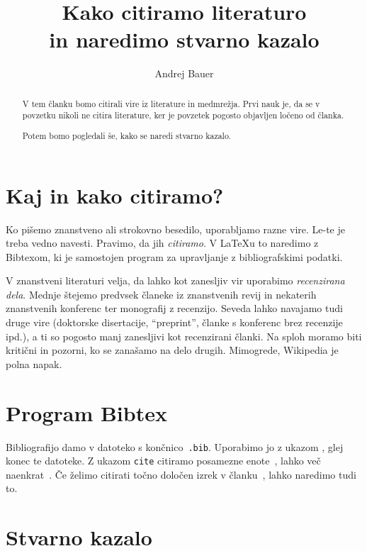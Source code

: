 \documentclass{article}
\begin{document}
\title{Kako citiramo literaturo\\ in naredimo stvarno kazalo}
\author{Andrej Bauer}
\maketitle

\begin{abstract}
  V tem članku bomo citirali vire iz literature in medmrežja.
  Prvi nauk je, da se v povzetku nikoli ne citira literature,
  ker je povzetek pogosto objavljen ločeno od članka.

  Potem bomo pogledali še, kako se naredi stvarno kazalo.
\end{abstract}


\section{Kaj in kako citiramo?}

Ko pišemo znanstveno ali strokovno besedilo, uporabljamo razne vire. Le-te je treba vedno
navesti. Pravimo, da jih \emph{citiramo}. V {\LaTeX}u to naredimo z Bibtexom, ki je
samostojen program za upravljanje z bibliografskimi podatki.

V znanstveni literaturi velja, da lahko kot zanesljiv vir uporabimo \emph{recenzirana
  dela}. Mednje štejemo predvsek članeke iz znanstvenih revij in nekaterih znanstvenih
konferenc ter monografij z recenzijo. Seveda lahko navajamo tudi druge vire (doktorske
disertacije, ``preprint'', članke s konferenc brez recenzije ipd.), a ti so pogosto manj
zanesljivi kot recenzirani članki.
%
Na sploh moramo biti kritični in pozorni, ko se
zanašamo na delo drugih. Mimogrede, Wikipedia je polna napak.

\section{Program Bibtex}

Bibliografijo damo v datoteko s končnico~\verb|.bib|. Uporabimo jo z ukazom
\verb||, glej konec te datoteke. Z ukazom \verb|cite| citiramo posamezne
enote~\cite{bauer06}, lahko več naenkrat~\cite{ersov80,lesnik10}. Če želimo citirati točno
določen izrek v članku~\cite[Izrek~2.1]{lawvere69}, lahko naredimo tudi to.
%

\section{Stvarno kazalo}
\end{document}
